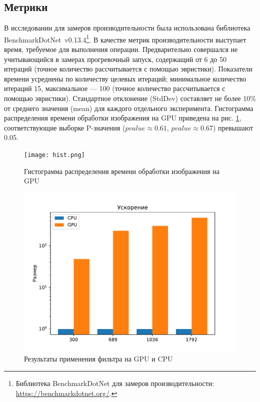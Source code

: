 \subsection{Метрики}

В исследовании для замеров производительности была использована библиотека Bench\-mark\-Dot\-Net~v0.13.4\footnote{Библиотека BenchmarkDotNet для замеров производительности: \url{https://benchmarkdotnet.org/}.}. В качестве метрик производительности выступает время, требуемое для выполнения операции. Предварительно совершался не учитывающийся в замерах прогревочный запуск, содержащий от 6 до 50 итераций (точное количество рассчитывается с помощью эвристики). Показатели времени усреднены по количеству целевых итераций; минимальное количество итераций 15, максимальное --- 100 (точное количество рассчитывается с помощью эвристики). Стандартное отклонение (StdDev) составляет не более 10\% от среднего значения (mean) для каждого отдельного эксперимента. Гистограмма распределения времени обработки изображения на GPU приведена на рис. \ref{fig:hist}, соответствующие выборке P-значения ($pvalue \approx 0.61$, $pvalue \approx 0.67$) превышают 0.05. 

\begin{figure}
    \centering
    \texttt{[image: hist.png]}
    \caption{Гистограмма распределения времени обработки изображения на GPU}
    \label{fig:hist}
\end{figure}

\begin{figure}
    \centering
    \includegraphics[height=0.8\textwidth]{figures/bar.pdf}
    \caption{Результаты применения фильтра на GPU и CPU\\}
    \label{fig:bar}
\end{figure}

